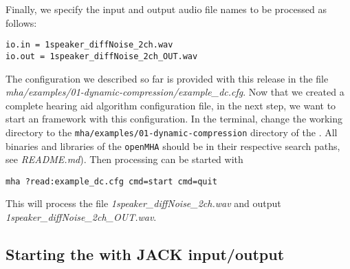 %
Finally, we specify the input and output audio file names to be processed as 
follows:
\begin{verbatim}
io.in = 1speaker_diffNoise_2ch.wav
io.out = 1speaker_diffNoise_2ch_OUT.wav
\end{verbatim}
The configuration we described so far is provided with this release 
in the file \emph{mha/examples/01-dynamic-compression/example\_dc.cfg}.
Now that we created a complete \mha{} hearing aid
algorithm configuration file, in the next step, we want to start an \mha{}
framework with this configuration.
%
In the terminal, change the working directory to the
\verb!mha/examples/01-dynamic-compression! 
directory of the \mha{}.
All binaries and libraries of the \verb!openMHA! should be in their respective
search paths, see \emph{README.md}).
Then \mha{} processing can be started with
\begin{verbatim}
mha ?read:example_dc.cfg cmd=start cmd=quit
\end{verbatim}
%
This will process the file \emph{1speaker\_diffNoise\_2ch.wav} and output 
\emph{1speaker\_diffNoise\_2ch\_OUT.wav}.


\subsection{Starting the \mhad{} with JACK input/output}%
\label{sec:example_jack}%
%
%
%

